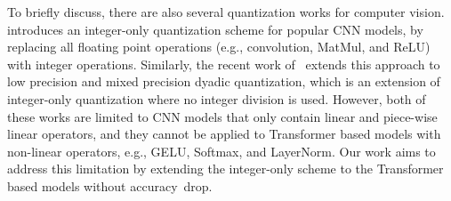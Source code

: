 To briefly discuss, there are also several quantization works for computer vision.
\cite{jacob2018quantization} introduces an integer-only quantization scheme for popular CNN models,
by replacing all floating point operations (e.g., convolution, MatMul, and ReLU) with integer operations.
Similarly, the recent work of~\cite{yao2020hawqv3} extends this approach to low precision and mixed precision dyadic quantization, which is an extension of integer-only quantization where no integer division is used.
However, both of these works are limited to CNN models that only contain linear and piece-wise linear operators, and they cannot be applied to Transformer based models with non-linear operators, e.g., GELU, Softmax, and LayerNorm. 
Our work aims to address this limitation by extending the integer-only scheme to the Transformer based models without accuracy~drop.